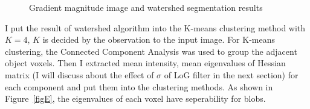 \documentclass[10pt]{article}
\begin{document}
\begin{figure}[h!tb]
  \centering
  \captionsetup[subfigure]{labelformat=empty}
    \hfill
   \hfill
\caption{Gradient magnitude image and watershed segmentation results}
\label{figGrW}
\end{figure}

I put the result of watershed algorithm into the K-means clustering method with $ K = 4 $, $K$ is decided by the observation to the input image. 
For K-means clustering, the Connected Component Analysis was used to group the adjacent object voxels. 
Then I extracted mean intensity, mean eigenvalues of Hessian matrix (I will discuss about the effect of $\sigma$ of LoG filter in the next section) for 
each component and put them into the clustering methods. As shown in Figure~\ref{figE}, the eigenvalues of each voxel have seperability for blobs.
\end{document}
